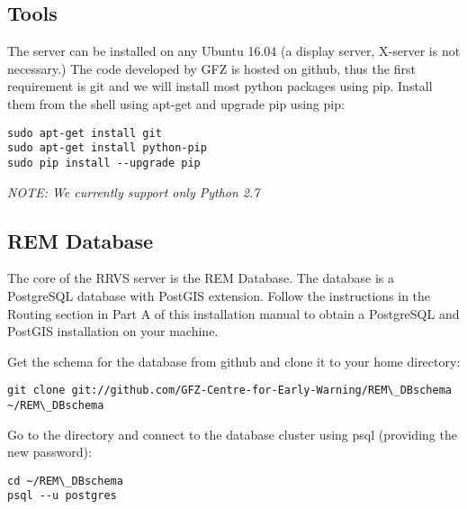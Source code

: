 \documentclass{article}
\begin{document}
\subsection{Tools}
The server can be installed on any Ubuntu 16.04 (a display server, X-server is not necessary.)
The code developed by GFZ is hosted on github, thus the first requirement is git and we will install most python packages using pip.
Install them from the shell using apt-get and upgrade pip using pip:

\begin{verbatim}
sudo apt-get install git
sudo apt-get install python-pip
sudo pip install --upgrade pip
\end{verbatim}

\textit{NOTE: We currently support only Python 2.7}

\subsection{REM Database}
The core of the RRVS server is the REM Database. The database
is a PostgreSQL database with PostGIS extension. Follow the 
instructions in the Routing section in Part A of this installation 
manual to obtain a
PostgreSQL and PostGIS installation on your machine.




Get the schema for the database from github and clone it to your home directory:
\begin{verbatim}
git clone git://github.com/GFZ-Centre-for-Early-Warning/REM\_DBschema ~/REM\_DBschema
\end{verbatim}

Go to the directory and connect to the database cluster using psql (providing the new password):
\begin{verbatim}
cd ~/REM\_DBschema
psql --u postgres
\end{verbatim}
\end{document}
